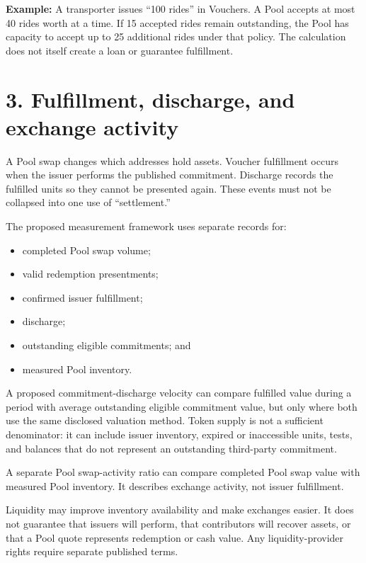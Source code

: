 \documentclass[11pt]{article}
\begin{document}
\textbf{Example:} A transporter issues ``100 rides'' in Vouchers. A Pool accepts at most 40 rides worth at a time. If 15 accepted rides remain outstanding, the Pool has capacity to accept up to 25 additional rides under that policy. The calculation does not itself create a loan or guarantee fulfillment.



\section*{3. Fulfillment, discharge, and exchange activity}

A Pool swap changes which addresses hold assets. Voucher fulfillment occurs when the issuer performs the published commitment. Discharge records the fulfilled units so they cannot be presented again. These events must not be collapsed into one use of ``settlement.''

The proposed measurement framework uses separate records for:

\begin{itemize}[leftmargin=*]
\item completed Pool swap volume;
\item valid redemption presentments;
\item confirmed issuer fulfillment;
\item discharge;
\item outstanding eligible commitments; and
\item measured Pool inventory.
\end{itemize}
A proposed commitment-discharge velocity can compare fulfilled value during a period with average outstanding eligible commitment value, but only where both use the same disclosed valuation method. Token supply is not a sufficient denominator: it can include issuer inventory, expired or inaccessible units, tests, and balances that do not represent an outstanding third-party commitment.

A separate Pool swap-activity ratio can compare completed Pool swap value with measured Pool inventory. It describes exchange activity, not issuer fulfillment.

Liquidity may improve inventory availability and make exchanges easier. It does not guarantee that issuers will perform, that contributors will recover assets, or that a Pool quote represents redemption or cash value. Any liquidity-provider rights require separate published terms.
\end{document}
